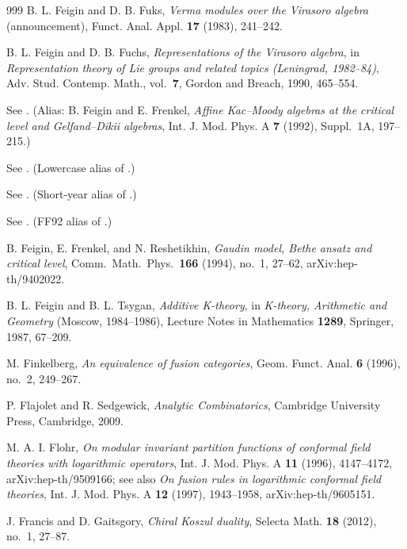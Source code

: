 \begin{thebibliography}{999}
B. L. Feigin and D. B. Fuks, \emph{Verma modules over the Virasoro algebra} (announcement), Funct. Anal. Appl. \textbf{17} (1983), 241--242.

B. L. Feigin and D. B. Fuchs, \emph{Representations of the Virasoro algebra}, in \emph{Representation theory of Lie groups and related topics (Leningrad, 1982--84)}, Adv. Stud. Contemp. Math., vol.~\textbf{7}, Gordon and Breach, 1990, 465--554.

See \cite{Feigin-Frenkel}. (Alias: B. Feigin and E. Frenkel, \emph{Affine Kac--Moody algebras at the critical level and Gelfand--Dikii algebras}, Int. J. Mod. Phys. A \textbf{7} (1992), Suppl.~1A, 197--215.)

See \cite{Feigin-Frenkel}. (Lowercase alias of \cite{FeiginFrenkel1992}.)

See \cite{Feigin-Frenkel}. (Short-year alias of \cite{FeiginFrenkel1992}.)

See \cite{Feigin-Frenkel}. (FF92 alias of \cite{FeiginFrenkel1992}.)

B. Feigin, E. Frenkel, and N. Reshetikhin, \emph{Gaudin model, Bethe ansatz and critical level}, Comm.\ Math.\ Phys.\ \textbf{166} (1994), no.~1, 27--62, arXiv:hep-th/9402022.

B. L. Feigin and B. L. Tsygan, \emph{Additive K-theory}, in \emph{K-theory, Arithmetic and Geometry} (Moscow, 1984--1986), Lecture Notes in Mathematics \textbf{1289}, Springer, 1987, 67--209.

M. Finkelberg, \emph{An equivalence of fusion categories}, Geom. Funct. Anal. \textbf{6} (1996), no.~2, 249--267.

P. Flajolet and R. Sedgewick, \emph{Analytic Combinatorics}, Cambridge University Press, Cambridge, 2009.

M. A. I. Flohr, \emph{On modular invariant partition functions of conformal field theories with logarithmic operators}, Int. J. Mod. Phys. A \textbf{11} (1996), 4147--4172, arXiv:hep-th/9509166; see also \emph{On fusion rules in logarithmic conformal field theories}, Int. J. Mod. Phys. A \textbf{12} (1997), 1943--1958, arXiv:hep-th/9605151.

J. Francis and D. Gaitsgory, \emph{Chiral Koszul duality}, Selecta Math. \textbf{18} (2012), no.~1, 27--87.


\end{thebibliography}
